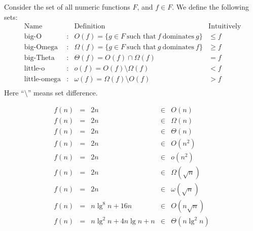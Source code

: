 \begin{flex}
\label{grp:def:analysis::asymptotics::o-o-notation}

\begin{definition}
\label{def:analysis::asymptotics::o-o-notation}
Consider the set of all numeric functions $F$, and $f \in F$.   We define the following sets:
\[
\begin{array}{lclc}
~\mbox{Name} &   & \mbox{Definition}  & \mbox{Intuitively}\\ \hline
~\mbox{big-O} & : & O(f)  = \{g \in F ~\mbox{such that}~
                    f~\mbox{dominates}~g\} & \leq f \\
~\mbox{big-Omega} & : & \Omega(f) = \{g \in F ~\mbox{such that}~ g
                        ~\mbox{dominates}~f\} & \geq f \\
~\mbox{big-Theta} & : & \Theta(f) =  O(f) \cap \Omega(f) & = f\\
~\mbox{little-o} & : & o(f) =  O(f) \setminus \Omega(f) & < f \\
~\mbox{little-omega} & : & \omega(f) =  \Omega(f) \setminus O(f) & > f\\
\end{array}
\]
Here ``$\setminus$'' means set difference.

\end{definition}

\begin{example}
\label{xmpl:analysis::asymptotics::lclcl}
\[
\begin{array}{lclcl}
f(n) & = & 2n & \in & O(n) \\
f(n) & = & 2n & \in & \Omega(n) \\
f(n) & = & 2n & \in &  \Theta(n) \\
f(n) & = & 2n & \in & O(n^2) \\
f(n) & = & 2n & \in & o(n^2) \\ 
f(n) & = & 2n & \in & \Omega(\sqrt{n}) \\
f(n) & = & 2n & \in & \omega(\sqrt{n}) \\
f(n) & = & n\lg^8{n} + 16n & \in & O(n\sqrt{n}) \\
f(n) & = & n\lg^2{n} + 4n\lg{n} + n & \in & \Theta(n \lg^2 n) \\
\end{array}
\]

\end{example}
\end{flex}

